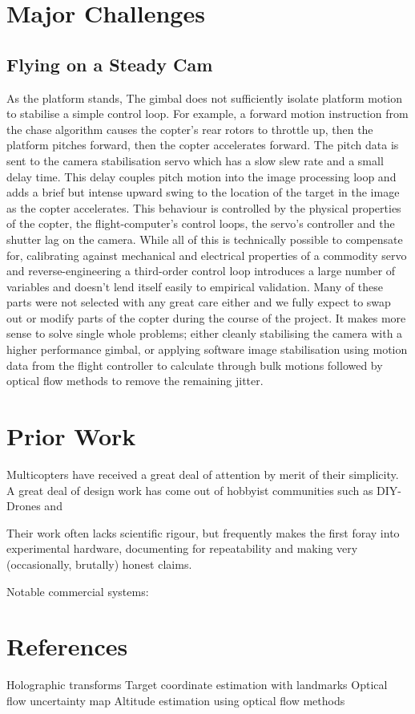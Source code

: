 \documentclass[11pt]{article}
\begin{document}
  \section{Major Challenges}
    \subsection{Flying on a Steady Cam}
    \label{sec:Camera Stability}
      As the platform stands, The gimbal does not sufficiently isolate platform motion to stabilise a simple control loop.
      For example, a forward motion instruction from the chase algorithm causes the copter's rear rotors to throttle up, then the platform pitches forward, then the copter accelerates forward.  The pitch data is sent to the camera stabilisation servo which has a slow slew rate and a small delay time.  This delay couples pitch motion into the image processing loop and adds a brief but intense upward swing to the location of the target in the image as the copter accelerates.
      This behaviour is controlled by the physical properties of the copter, the flight-computer's control loops, the servo's controller and the shutter lag on the camera. While all of this is technically possible to compensate for, calibrating against mechanical and electrical properties of a commodity servo and reverse-engineering a third-order control loop introduces a large number of variables and doesn't lend itself easily to empirical validation.  Many of these parts were not selected with any great care either and we fully expect to swap out or modify parts of the copter during the course of the project.
      It makes more sense to solve single whole problems; either cleanly stabilising the camera with a higher performance gimbal, or applying software image stabilisation using motion data from the flight controller to calculate through bulk motions followed by optical flow methods to remove the remaining jitter.

    

  \section{Prior Work}
    Multicopters have received a great deal of attention by merit of their simplicity. A great deal of design work has come out of hobbyist communities such as DIY-Drones and
    
    Their work often lacks scientific rigour, but frequently makes the first foray into experimental hardware, documenting for repeatability and making very (occasionally, brutally) honest claims.

    Notable commercial systems:

  \section{References}
    Holographic transforms
    Target coordinate estimation with landmarks
    Optical flow uncertainty map
    Altitude estimation using optical flow methods











	
\end{document}
